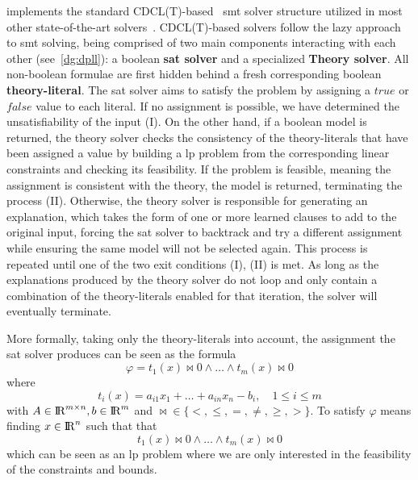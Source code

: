 \documentclass[runningheads]{llncs}
\begin{document}
\dlinear implements the standard CDCL(T)-based~\cite{ref:dpll-t} \gls{smt} solver structure utilized in most other state-of-the-art solvers~\cite{ref:cvc5}.
CDCL(T)-based solvers follow the lazy approach to \gls{smt} solving, being comprised of two main components interacting with each other (see~\autoref{dg:dpll}): a boolean \textbf{\gls{sat} solver} and a specialized \textbf{Theory solver}.
All non-boolean formulae are first hidden behind a fresh corresponding boolean \textbf{theory-literal}.
The \gls{sat} solver aims to satisfy the problem by assigning a $true$ or $false$ value to each literal.
If no assignment is possible, we have determined the unsatisfiability of the input (I).
On the other hand, if a boolean model is returned, the theory solver checks the consistency of the theory-literals that have been assigned a value by building a \gls{lp} problem from the corresponding linear constraints and checking its feasibility.
If the problem is feasible, meaning the assignment is consistent with the theory, the model is returned, terminating the process (II).
Otherwise, the theory solver is responsible for generating an explanation, which takes the form of one or more learned clauses to add to the original input, forcing the \gls{sat} solver to backtrack and try a different assignment while ensuring the same model will not be selected again.
This process is repeated until one of the two exit conditions (I), (II) is met.
As long as the explanations produced by the theory solver do not loop and only contain a combination of the theory-literals enabled for that iteration, the solver will eventually terminate.


More formally, taking only the theory-literals into account, the assignment the \gls{sat} solver produces can be seen as the formula
\begin{equation} %
    \label{eq:smt-formula}
    \varphi = t_1(x) \bowtie 0 \wedge \ldots \wedge t_m (x) \bowtie 0
\end{equation}
where
\begin{equation*}
    t_i(x) = a_{i1}x_1 + \ldots + a_{in}x_n - b_i, \quad 1 \le i \le m
\end{equation*}
with $A \in {\rm I\!R}^{m \times n}, b \in {\rm I\!R}^m$ and $\bowtie \in \{<, \le, =, \ne, \ge, >\}$.
To satisfy $\varphi$ means finding $x \in {\rm I\!R}^n $ such that that
\begin{equation*}
    t_1(x) \bowtie 0 \wedge \ldots \wedge t_m(x) \bowtie 0
\end{equation*}
which can be seen as an \gls{lp} problem where we are only interested in the feasibility of the constraints and bounds.
\end{document}
